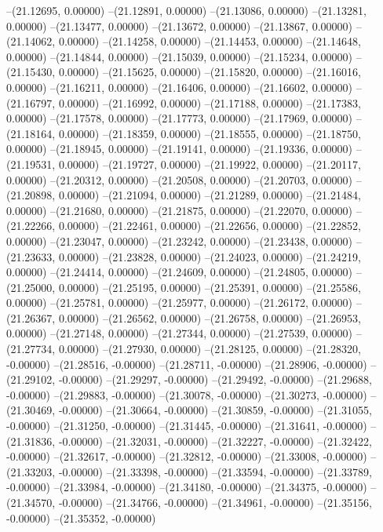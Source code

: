 --(21.12695, 0.00000)
--(21.12891, 0.00000)
--(21.13086, 0.00000)
--(21.13281, 0.00000)
--(21.13477, 0.00000)
--(21.13672, 0.00000)
--(21.13867, 0.00000)
--(21.14062, 0.00000)
--(21.14258, 0.00000)
--(21.14453, 0.00000)
--(21.14648, 0.00000)
--(21.14844, 0.00000)
--(21.15039, 0.00000)
--(21.15234, 0.00000)
--(21.15430, 0.00000)
--(21.15625, 0.00000)
--(21.15820, 0.00000)
--(21.16016, 0.00000)
--(21.16211, 0.00000)
--(21.16406, 0.00000)
--(21.16602, 0.00000)
--(21.16797, 0.00000)
--(21.16992, 0.00000)
--(21.17188, 0.00000)
--(21.17383, 0.00000)
--(21.17578, 0.00000)
--(21.17773, 0.00000)
--(21.17969, 0.00000)
--(21.18164, 0.00000)
--(21.18359, 0.00000)
--(21.18555, 0.00000)
--(21.18750, 0.00000)
--(21.18945, 0.00000)
--(21.19141, 0.00000)
--(21.19336, 0.00000)
--(21.19531, 0.00000)
--(21.19727, 0.00000)
--(21.19922, 0.00000)
--(21.20117, 0.00000)
--(21.20312, 0.00000)
--(21.20508, 0.00000)
--(21.20703, 0.00000)
--(21.20898, 0.00000)
--(21.21094, 0.00000)
--(21.21289, 0.00000)
--(21.21484, 0.00000)
--(21.21680, 0.00000)
--(21.21875, 0.00000)
--(21.22070, 0.00000)
--(21.22266, 0.00000)
--(21.22461, 0.00000)
--(21.22656, 0.00000)
--(21.22852, 0.00000)
--(21.23047, 0.00000)
--(21.23242, 0.00000)
--(21.23438, 0.00000)
--(21.23633, 0.00000)
--(21.23828, 0.00000)
--(21.24023, 0.00000)
--(21.24219, 0.00000)
--(21.24414, 0.00000)
--(21.24609, 0.00000)
--(21.24805, 0.00000)
--(21.25000, 0.00000)
--(21.25195, 0.00000)
--(21.25391, 0.00000)
--(21.25586, 0.00000)
--(21.25781, 0.00000)
--(21.25977, 0.00000)
--(21.26172, 0.00000)
--(21.26367, 0.00000)
--(21.26562, 0.00000)
--(21.26758, 0.00000)
--(21.26953, 0.00000)
--(21.27148, 0.00000)
--(21.27344, 0.00000)
--(21.27539, 0.00000)
--(21.27734, 0.00000)
--(21.27930, 0.00000)
--(21.28125, 0.00000)
--(21.28320, -0.00000)
--(21.28516, -0.00000)
--(21.28711, -0.00000)
--(21.28906, -0.00000)
--(21.29102, -0.00000)
--(21.29297, -0.00000)
--(21.29492, -0.00000)
--(21.29688, -0.00000)
--(21.29883, -0.00000)
--(21.30078, -0.00000)
--(21.30273, -0.00000)
--(21.30469, -0.00000)
--(21.30664, -0.00000)
--(21.30859, -0.00000)
--(21.31055, -0.00000)
--(21.31250, -0.00000)
--(21.31445, -0.00000)
--(21.31641, -0.00000)
--(21.31836, -0.00000)
--(21.32031, -0.00000)
--(21.32227, -0.00000)
--(21.32422, -0.00000)
--(21.32617, -0.00000)
--(21.32812, -0.00000)
--(21.33008, -0.00000)
--(21.33203, -0.00000)
--(21.33398, -0.00000)
--(21.33594, -0.00000)
--(21.33789, -0.00000)
--(21.33984, -0.00000)
--(21.34180, -0.00000)
--(21.34375, -0.00000)
--(21.34570, -0.00000)
--(21.34766, -0.00000)
--(21.34961, -0.00000)
--(21.35156, -0.00000)
--(21.35352, -0.00000)
